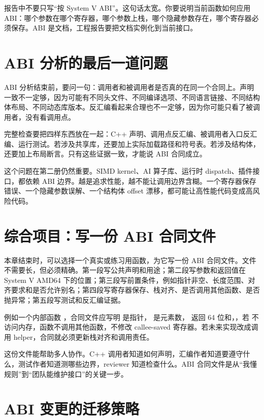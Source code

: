 报告中不要只写“按 System V ABI”。这句话太宽。你要说明当前函数如何应用 ABI：哪个参数在哪个寄存器，哪个参数上栈，哪个隐藏参数存在，哪个寄存器必须保存。ABI 是文档，工程报告要把文档实例化到当前接口。

\section{ABI 分析的最后一道问题}

ABI 分析结束前，要问一句：调用者和被调用者是否真的在同一个合同上。声明一致不一定够，因为可能有不同头文件、不同编译选项、不同语言链接、不同结构体布局、不同动态库版本。反汇编看起来合理也不一定够，因为你可能只看了被调用者，没有看调用点。

完整检查要把四样东西放在一起：C++ 声明、调用点反汇编、被调用者入口反汇编、运行测试。若涉及共享库，还要加上实际加载路径和符号表。若涉及结构体，还要加上布局断言。只有这些证据一致，才能说 ABI 合同成立。

这个问题在第二册仍然重要。SIMD kernel、AI 算子库、运行时 dispatch、插件接口，都依赖 ABI 边界。越是追求性能，越不能让调用边界含糊。一个寄存器保存错误、一个隐藏参数误解、一个结构体 offset 漂移，都可能让高性能代码变成高风险代码。

\section{综合项目：写一份 ABI 合同文件}

本章结束时，可以选择一个真实或练习用函数，为它写一份 ABI 合同文件。文件不需要长，但必须精确。第一段写公共声明和用途；第二段写参数和返回值在 System V AMD64 下的位置；第三段写前置条件，例如指针非空、长度范围、对齐要求和是否允许别名；第四段写寄存器保存、栈对齐、是否调用其他函数、是否抛异常；第五段写测试和反汇编证据。

例如一个内部函数 ，合同文件应写明  是指针， 是元素数， 返回 64 位和，，若  不访问内存，函数不调用其他函数，不修改 callee-saved 寄存器。若未来实现改成调用 helper，合同就必须更新栈对齐和调用责任。

这份文件能帮助多人协作。C++ 调用者知道如何声明，汇编作者知道要遵守什么，测试作者知道测哪些边界，reviewer 知道检查什么。ABI 合同文件是从“我懂规则”到“团队能维护接口”的关键一步。

\section{ABI 变更的迁移策略}


